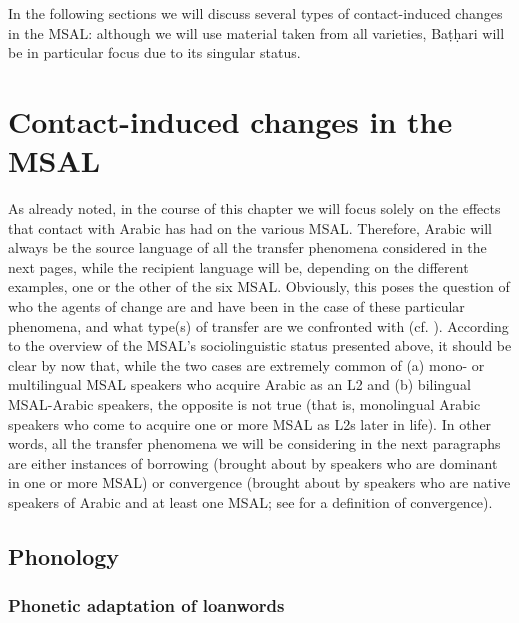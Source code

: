 \documentclass[output=paper]{langsci/langscibook}
\begin{document}
In the following sections we will discuss several types of contact-induced changes in the MSAL: although we will use material taken from all varieties, Baṭḥari will be in particular focus due to its singular status.

\section{Contact-induced changes in the MSAL}\label{sec:3}

As already noted, in the course of this chapter we will focus solely on the effects that contact with Arabic has had on the various MSAL. Therefore, Arabic will always be the source language of all the transfer phenomena considered in the next pages, while the recipient language will be, depending on the different examples, one or the other of the six MSAL. Obviously, this poses the question of who the agents of change are and have been in the case of these particular phenomena, and what type(s) of transfer are we confronted with (cf. \citealt{VanCoetsem1988,VanCoetsem2000,Winford2005}). According to the overview of the MSAL’s sociolinguistic status presented above, it should be clear by now that, while the two cases are extremely common of (a) mono- or multilingual MSAL speakers who acquire Arabic as an L2 and (b) bilingual MSAL-Arabic speakers, the opposite is not true (that is, monolingual Arabic speakers who come to acquire one or more MSAL as L2s later in life). In other words, all the transfer phenomena we will be considering in the next paragraphs are either instances of borrowing (brought about by speakers who are dominant in one or more MSAL) or convergence (brought about by speakers who are native speakers of Arabic and at least one MSAL; see \citealt{Lucas2015} for a definition of convergence). 


 
 \subsection{Phonology}
 \subsubsection{Phonetic adaptation of loanwords}
\end{document}

